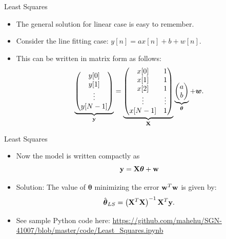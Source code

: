 \documentclass[10pt, aspectratio=169]{beamer} %
\newcommand{\thb}{\boldsymbol{\theta}}
\newcommand{\w}{{\bf w}}
\newcommand{\X}{{\bf X}}
\newcommand{\y}{{\bf y}}
\begin{document}
\begin{frame}[allowframebreaks=0.8]
 {Least Squares}
 \begin{itemize}

\item The general solution for linear case is easy to remember.
\item Consider the line fitting case:
\(
y[n] = ax[n] + b + w[n].
\)
\item This can be written in matrix form as follows:
\[
\underbrace{\begin{pmatrix}
y[0]\\y[1]\\ \vdots\\y[N-1]
\end{pmatrix}}_{\y}
 = 
\underbrace{
\begin{pmatrix}
x[0] & 1\\
x[1] & 1\\
x[2] & 1\\
\vdots & \vdots\\
x[N-1] & 1
\end{pmatrix}}_{\X}
\underbrace{
\begin{pmatrix}a\\b\end{pmatrix}}_{\thb}
 + \boldsymbol{w}.
\]
\end{itemize}
\end{frame}


\begin{frame}[allowframebreaks=0.8]
 {Least Squares}
 \begin{itemize}
\item Now the model is written compactly as
\[
\y = \X\thb + \w
\]

\item Solution: The value of $\thb$ minimizing the error $\w^T\w$ is given by:
\[
\hat{\thb}_{LS} = \left(\X^T\X\right)^{-1}\X^T\y.
\]
\item See sample Python code here:
\url{https://github.com/mahehu/SGN-41007/blob/master/code/Least_Squares.ipynb}

\end{itemize}

\end{frame}
\end{document}
